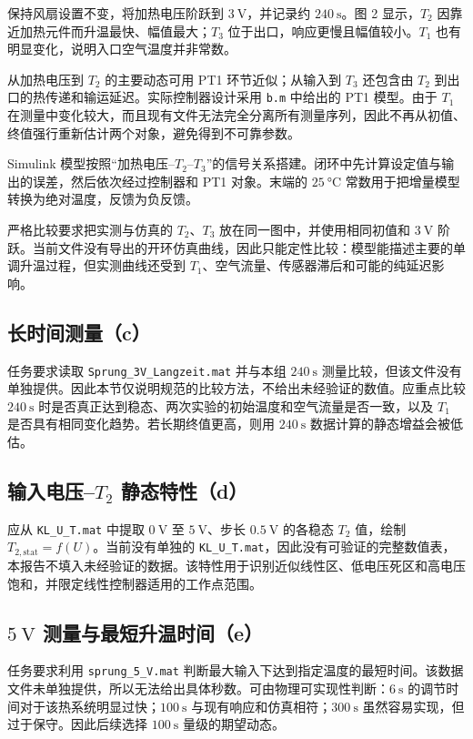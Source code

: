 保持风扇设置不变，将加热电压阶跃到 $\SI{3}{\volt}$，并记录约 $\SI{240}{\second}$。图 2 显示，$T_2$ 因靠近加热元件而升温最快、幅值最大；$T_3$ 位于出口，响应更慢且幅值较小。$T_1$ 也有明显变化，说明入口空气温度并非常数。

从加热电压到 $T_2$ 的主要动态可用 PT1 环节近似；从输入到 $T_3$ 还包含由 $T_2$ 到出口的热传递和输运延迟。实际控制器设计采用 \texttt{b.m} 中给出的 PT1 模型。由于 $T_1$ 在测量中变化较大，而且现有文件无法完全分离所有测量序列，因此不再从初值、终值强行重新估计两个对象，避免得到不可靠参数。

Simulink 模型按照“加热电压--$T_2$--$T_3$”的信号关系搭建。闭环中先计算设定值与输出的误差，然后依次经过控制器和 PT1 对象。末端的 $\SI{25}{\celsius}$ 常数用于把增量模型转换为绝对温度，反馈为负反馈。

严格比较要求把实测与仿真的 $T_2$、$T_3$ 放在同一图中，并使用相同初值和 $\SI{3}{\volt}$ 阶跃。当前文件没有导出的开环仿真曲线，因此只能定性比较：模型能描述主要的单调升温过程，但实测曲线还受到 $T_1$、空气流量、传感器滞后和可能的纯延迟影响。

\subsection{长时间测量（c）}

任务要求读取 \texttt{Sprung\_3V\_Langzeit.mat} 并与本组 $\SI{240}{\second}$ 测量比较，但该文件没有单独提供。因此本节仅说明规范的比较方法，不给出未经验证的数值。应重点比较 $\SI{240}{\second}$ 时是否真正达到稳态、两次实验的初始温度和空气流量是否一致，以及 $T_1$ 是否具有相同变化趋势。若长期终值更高，则用 $\SI{240}{\second}$ 数据计算的静态增益会被低估。

\subsection{输入电压--$T_2$ 静态特性（d）}

应从 \texttt{KL\_U\_T.mat} 中提取 $\SI{0}{\volt}$ 至 $\SI{5}{\volt}$、步长 $\SI{0.5}{\volt}$ 的各稳态 $T_2$ 值，绘制 $T_{2,\mathrm{stat}} = f(U)$。当前没有单独的 \texttt{KL\_U\_T.mat}，因此没有可验证的完整数值表，本报告不填入未经验证的数据。该特性用于识别近似线性区、低电压死区和高电压饱和，并限定线性控制器适用的工作点范围。

\subsection{$\SI{5}{\volt}$ 测量与最短升温时间（e）}

任务要求利用 \texttt{sprung\_5\_V.mat} 判断最大输入下达到指定温度的最短时间。该数据文件未单独提供，所以无法给出具体秒数。可由物理可实现性判断：$\SI{6}{\second}$ 的调节时间对于该热系统明显过快；$\SI{100}{\second}$ 与现有响应和仿真相符；$\SI{300}{\second}$ 虽然容易实现，但过于保守。因此后续选择 $\SI{100}{\second}$ 量级的期望动态。

